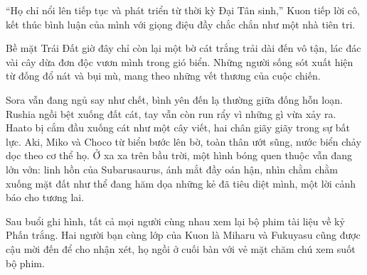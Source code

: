 \documentclass[../main.tex]{subfiles}
\begin{document}

``Họ chỉ nổi lên tiếp tục và phát triển từ thời kỳ Đại Tân sinh,'' Kuon tiếp lời cô, kết thúc bình luận của mình với giọng điệu đầy chắc chắn như một nhà tiên tri.

Bề mặt Trái Đất giờ đây chỉ còn lại một bờ cát trắng trải dài đến vô tận, lác đác vài cây dừa đơn độc vươn mình trong gió biển. Những người sống sót xuất hiện từ đống đổ nát và bụi mù, mang theo những vết thương của cuộc chiến.

Sora vẫn đang ngủ say như chết, bình yên đến lạ thường giữa đống hỗn loạn. Rushia ngồi bệt xuống đất cát, tay vẫn còn run rẩy vì những gì vừa xảy ra. Haato bị cắm đầu xuống cát như một cây viết, hai chân giãy giãy trong sự bất lực. Aki, Miko và Choco từ biển bước lên bờ, toàn thân ướt sũng, nước biển chảy dọc theo cơ thể họ. Ở xa xa trên bầu trời, một hình bóng quen thuộc vẫn đang lởn vởn: linh hồn của Subarusaurus, ánh mắt đầy oán hận, nhìn chằm chằm xuống mặt đất như thể đang hăm dọa những kẻ đã tiêu diệt mình, một lời cảnh báo cho tương lai.



\omk



Sau buổi ghi hình, tất cả mọi người cùng nhau xem lại bộ phim tài liệu về kỷ Phấn trắng. Hai người bạn cùng lớp của Kuon là Miharu và Fukuyasu cũng được cậu mời đến để cho nhận xét, họ ngồi ở cuối bàn với vẻ mặt chăm chú xem suốt bộ phim.
\end{document}
